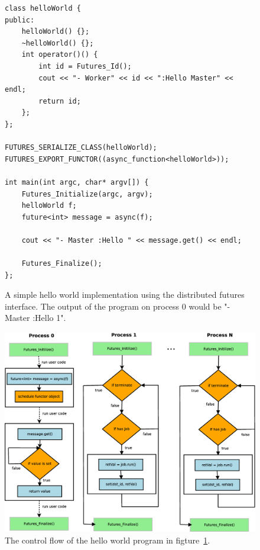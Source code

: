 \begin{figure}[!ht]
\begin{lstlisting}
class helloWorld {
public:
	helloWorld() {};
	~helloWorld() {};
	int operator()() { 
		int id = Futures_Id();
		cout << "- Worker" << id << ":Hello Master" << endl;
		return id;
	};
};

FUTURES_SERIALIZE_CLASS(helloWorld);
FUTURES_EXPORT_FUNCTOR((async_function<helloWorld>));

int main(int argc, char* argv[]) {
	Futures_Initialize(argc, argv);
	helloWorld f;
	future<int> message = async(f);

	cout << "- Master :Hello " << message.get() << endl;

	Futures_Finalize();
};
\end{lstlisting}
\caption{
A simple hello world implementation using the distributed futures interface.  
The output of the program on process 0 would be "- Master :Hello 1".}
\label{lst:hello}
\end{figure}

\begin{figure}[!ht]
\includegraphics[width=\columnwidth]{figures/hello_flow}
\caption{
The control flow of the hello world program in figture~\ref{lst:hello}.}
\label{fig:helloCF}
\end{figure}


